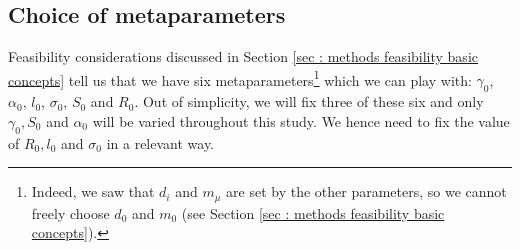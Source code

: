 \documentclass[12pt]{report}
\begin{document}
\subsection{Choice of metaparameters}

Feasibility considerations discussed in Section \ref{sec : methods feasibility basic concepts} tell us that we have six metaparameters\footnote{Indeed, we saw that $d_i$ and $m_\mu$ are set by the other parameters, so we cannot freely choose $d_0$ and $m_0$ (see Section \ref{sec : methods feasibility basic concepts}).} which we can play with: $\gamma_0$, $\alpha_0$, $l_0$, $\sigma_0$, $S_0$ and $R_0$. Out of simplicity, we will fix three of these six and only $\gamma_0, S_0$ and $\alpha_0$ will be varied throughout this study. We hence need to fix the value of $R_0, l_0$ and $\sigma_0$ in a relevant way.
\end{document}
